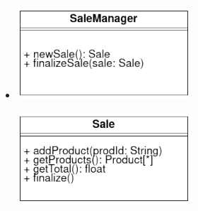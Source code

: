 \documentclass{article}
\begin{document}
\begin{itemize}
\item[]\begin{minipage}{\textwidth}
  \centering
  \begin{minipage}[t]{0.4\textwidth}
    \includegraphics[width=\textwidth]{foto 5.png}
  \end{minipage}
  \begin{minipage}[t]{0.4\textwidth}
    \includegraphics[width=\textwidth]{foto 6.png}
  \end{minipage}
\end{minipage}
\end{itemize}
\end{document}
